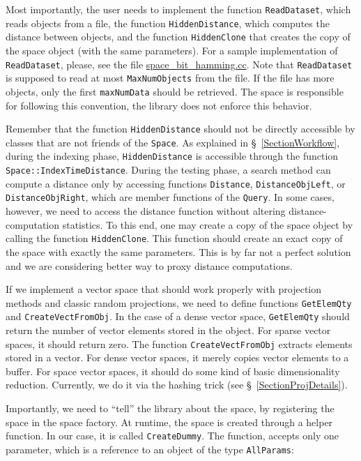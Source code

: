 \documentclass[runningheads,a4paper]{llncs}
\newcommand{\replocfile}{https://github.com/searchivarius/NonMetricSpaceLib/blob/pserv/}
\newcommand{\ttt}[1]{\texttt{#1}}
\begin{document}
Most importantly, the user needs to implement the function \ttt{ReadDataset},
which reads objects from a file, the function \ttt{HiddenDistance},
which computes the distance between objects,
and the function \ttt{HiddenClone} that creates the copy of the space object (with the same parameters).
For a sample implementation of \ttt{ReadDataset},
please, see the file
\href{\replocfile similarity_search/src/space/space_bit_hamming.cc}{space\_bit\_hamming.cc}.
Note that \ttt{ReadDataset} is supposed to read at most \ttt{MaxNumObjects}
from the file. If the file has more objects, only the first \ttt{maxNumData} should be retrieved.
The space is responsible for following this convention, the library does not enforce this behavior.

Remember that the function \ttt{HiddenDistance} should not be directly accessible 
by classes that are not friends of the \ttt{Space}.
As explained in \S~\ref{SectionWorkflow},
during the indexing phase, 
\ttt{HiddenDistance} is accessible through the function
\ttt{Space::IndexTimeDistance}.
During the testing phase, a search method can compute a distance
only by accessing functions \ttt{Distance}, \ttt{DistanceObjLeft}, or
\ttt{DistanceObjRight}, which are member functions of the \ttt{Query}.
In some cases, however, we need to access the distance function without
altering distance-computation statistics. To this end, one may create
a copy of the space object by calling the function \ttt{HiddenClone}. 
This function should create an exact copy of the space with exactly
the same parameters.
This is by far not a perfect solution and we are considering better
way to proxy distance computations. 

If we implement a vector space that should work properly with projection methods
and classic random projections, we need to define functions \ttt{GetElemQty} and \ttt{CreateVectFromObj}. 
In the case of a dense vector space, \ttt{GetElemQty}
should return the number of vector elements stored in the object.
For sparse vector spaces, it should return zero. The function \ttt{CreateVectFromObj}
extracts elements stored in a vector. For dense vector spaces,
it merely copies vector elements to a buffer. For space vector spaces,
it should do some kind of basic dimensionality reduction. 
Currently, we do it via the hashing trick (see \S~\ref{SectionProjDetails}).

Importantly, we need to ``tell'' the library about the space,
by registering the space in the space factory.
At runtime, the space is created through a helper function.
In our case, it is called \ttt{CreateDummy}.
The function, accepts only one parameter,
which is a reference to an object of the type \ttt{AllParams}:
\end{document}
